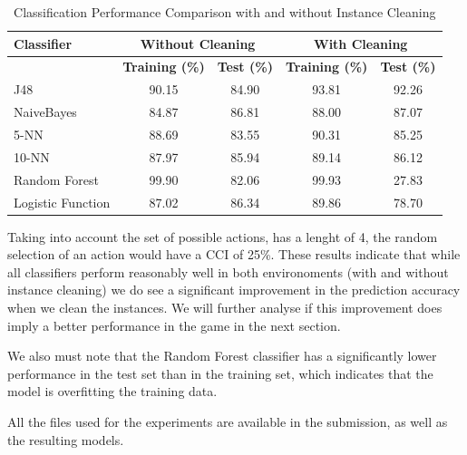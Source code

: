 \documentclass[12pt,a4paper]{article}
\begin{document}
\begin{table}[ht]
\centering
\caption{Classification Performance Comparison with and without Instance Cleaning}
\label{tab:results}
\begin{tabular}{lcccc}
\hline
\textbf{Classifier} & \multicolumn{2}{c}{\textbf{Without Cleaning}} & \multicolumn{2}{c}{\textbf{With Cleaning}} \\ \hline
                    & \textbf{Training (\%)} & \textbf{Test (\%)} & \textbf{Training (\%)} & \textbf{Test (\%)} \\ \hline
J48                 & 90.15                       & 84.90                     & 93.81                       & 92.26                     \\
NaiveBayes          & 84.87                       & 86.81                     & 88.00                       & 87.07                     \\
5-NN                & 88.69                       & 83.55                     & 90.31                       & 85.25                     \\
10-NN               & 87.97                       & 85.94                     & 89.14                       & 86.12                    \\
Random Forest       & 99.90                       & 82.06                     & 99.93                       & 27.83                    \\ 
Logistic Function   & 87.02                       & 86.34                     & 89.86                       & 78.70                     \\\hline
\end{tabular}
\end{table}

Taking into account the set of possible actions, has a lenght of 4, the random selection of an action would have a CCI of 25\%.
These results indicate that while all classifiers perform reasonably well in both environoments (with and without instance cleaning)
we do see a significant improvement in the prediction accuracy when we clean the instances.
We will further analyse if this improvement does imply a better performance in the game in the next section.

We also must note that the Random Forest classifier has a significantly lower performance in the test set than in the training set, which indicates that the model is overfitting the training data.

All the files used for the experiments are available in the submission, as well as the resulting models.
\end{document}
